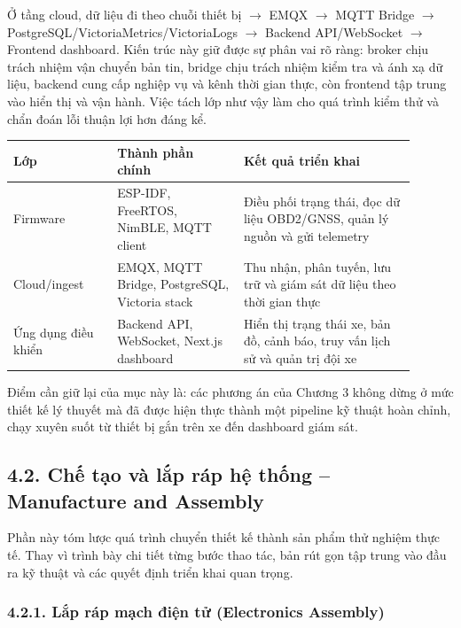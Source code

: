\documentclass[a4paper]{extarticle}
\begin{document}
Ở tầng cloud, dữ liệu đi theo chuỗi thiết bị \(\rightarrow\) EMQX \(\rightarrow\) MQTT Bridge \(\rightarrow\) PostgreSQL/VictoriaMetrics/VictoriaLogs \(\rightarrow\) Backend API/WebSocket \(\rightarrow\) Frontend dashboard. Kiến trúc này giữ được sự phân vai rõ ràng: broker chịu trách nhiệm vận chuyển bản tin, bridge chịu trách nhiệm kiểm tra và ánh xạ dữ liệu, backend cung cấp nghiệp vụ và kênh thời gian thực, còn frontend tập trung vào hiển thị và vận hành. Việc tách lớp như vậy làm cho quá trình kiểm thử và chẩn đoán lỗi thuận lợi hơn đáng kể.

\begin{center}
\begin{tabular}{|p{0.23\linewidth}|p{0.29\linewidth}|p{0.38\linewidth}|}
\hline
\textbf{Lớp} & \textbf{Thành phần chính} & \textbf{Kết quả triển khai} \\
\hline
Firmware & ESP-IDF, FreeRTOS, NimBLE, MQTT client & Điều phối trạng thái, đọc dữ liệu OBD2/GNSS, quản lý nguồn và gửi telemetry \\
\hline
Cloud/ingest & EMQX, MQTT Bridge, PostgreSQL, Victoria stack & Thu nhận, phân tuyến, lưu trữ và giám sát dữ liệu theo thời gian thực \\
\hline
Ứng dụng điều khiển & Backend API, WebSocket, Next.js dashboard & Hiển thị trạng thái xe, bản đồ, cảnh báo, truy vấn lịch sử và quản trị đội xe \\
\hline
\end{tabular}
\end{center}

Điểm cần giữ lại của mục này là: các phương án của Chương 3 không dừng ở mức thiết kế lý thuyết mà đã được hiện thực thành một pipeline kỹ thuật hoàn chỉnh, chạy xuyên suốt từ thiết bị gắn trên xe đến dashboard giám sát.

\subsection{4.2. Chế tạo và lắp ráp hệ thống -- Manufacture and
Assembly}\label{42-chux1ebf-tux1ea1o-vuxe0-lux1eafp-ruxe1p-hux1ec7-thux1ed1ng--manufacture-and-assembly}

Phần này tóm lược quá trình chuyển thiết kế thành sản phẩm thử nghiệm thực tế. Thay vì trình bày chi tiết từng bước thao tác, bản rút gọn tập trung vào đầu ra kỹ thuật và các quyết định triển khai quan trọng.

\subsubsection{4.2.1. Lắp ráp mạch điện tử (Electronics
Assembly)}\label{421-lux1eafp-ruxe1p-mux1ea1ch-ux111iux1ec7n-tux1eed-electronics-assembly}
\end{document}
